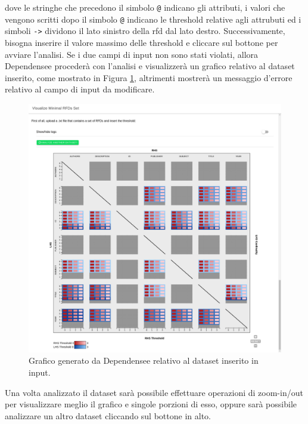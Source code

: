 dove le stringhe che precedono il simbolo \texttt{@} indicano gli attributi, i valori che vengono scritti dopo il simbolo \texttt{@} indicano le threshold relative agli attrubuti ed i simboli \texttt{->} dividono il lato sinistro della \acrshort{rfd} dal lato destro. Successivamente, bisogna inserire il valore massimo delle threshold e cliccare sul bottone per avviare l'analisi. Se i due campi di input non sono stati violati, allora Dependensee proceder\`{a} con l'analisi e visualizzer\`{a} un grafico relativo al dataset inserito, come mostrato in Figura \ref{fig:dependensee_dataset_analyzed}, altrimenti mostrer\`{a} un messaggio d'errore relativo al campo di input da modificare.
\begin{figure}[ht]
    \centering
    \includegraphics[width=\linewidth]{capitoli/figure/dependensee_analyzed_screen}
    \caption{Grafico generato da Dependensee relativo al dataset inserito in input.}
    \label{fig:dependensee_dataset_analyzed}
\end{figure}
Una volta analizzato il dataset sar\`{a} possibile effettuare operazioni di zoom-in/out per visualizzare meglio il grafico e singole porzioni di esso, oppure sar\`{a} possibile analizzare un altro dataset cliccando sul bottone in alto.